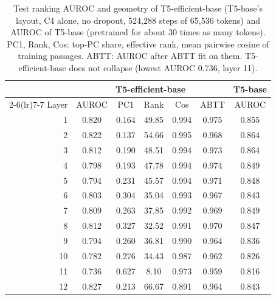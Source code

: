 \begin{table}[t]
\centering
\footnotesize
\setlength{\tabcolsep}{3pt}
\begin{tabular}{@{}rcccccc@{}}
\toprule
& \multicolumn{5}{c}{T5-efficient-base} & T5-base \\
\cmidrule(lr){2-6}\cmidrule(lr){7-7}
Layer & AUROC & PC1 & Rank & Cos & ABTT & AUROC \\
\midrule
1 & 0.820 & 0.164 & 49.85 & 0.994 & 0.975 & 0.855 \\
2 & 0.822 & 0.137 & 54.66 & 0.995 & 0.968 & 0.864 \\
3 & 0.812 & 0.190 & 48.51 & 0.994 & 0.973 & 0.864 \\
4 & 0.798 & 0.193 & 47.78 & 0.994 & 0.974 & 0.849 \\
5 & 0.794 & 0.231 & 45.57 & 0.994 & 0.971 & 0.848 \\
6 & 0.803 & 0.304 & 35.04 & 0.993 & 0.967 & 0.843 \\
7 & 0.809 & 0.263 & 37.85 & 0.992 & 0.969 & 0.849 \\
8 & 0.812 & 0.327 & 32.52 & 0.991 & 0.970 & 0.847 \\
9 & 0.794 & 0.260 & 36.81 & 0.990 & 0.964 & 0.836 \\
10 & 0.782 & 0.276 & 34.43 & 0.987 & 0.962 & 0.826 \\
11 & 0.736 & 0.627 & 8.10 & 0.973 & 0.959 & 0.816 \\
12 & 0.827 & 0.213 & 66.67 & 0.891 & 0.964 & 0.843 \\
\bottomrule
\end{tabular}
\caption{Test ranking AUROC and geometry of T5-efficient-base (T5-base's layout, C4 alone, no dropout, 524{,}288 steps of 65{,}536 tokens) and AUROC of T5-base (pretrained for about 30 times as many tokens). PC1, Rank, Cos: top-PC share, effective rank, mean pairwise cosine of training passages. ABTT: AUROC after ABTT fit on them. T5-efficient-base does not collapse (lowest AUROC 0.736, layer 11).}
\label{tab:d2_t5_efficient}
\end{table}
